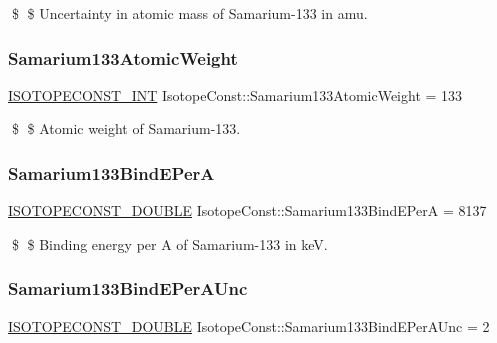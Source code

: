 \$ \$ Uncertainty in atomic mass of Samarium-\/133 in amu. \mbox{\label{group___isotope_const-_samarium-_sm133_ga2d8da4b99b3a0e80dea455f4bcf24f9e}} 
\subsubsection{\texorpdfstring{Samarium133\+Atomic\+Weight}{Samarium133AtomicWeight}}
{\footnotesize\ttfamily \mbox{\hyperlink{group___isotope_const-_macros_ga5f18360b3e99483a35c32d789e62621c}{I\+S\+O\+T\+O\+P\+E\+C\+O\+N\+S\+T\+\_\+\+I\+NT}} Isotope\+Const\+::\+Samarium133\+Atomic\+Weight = 133}

\$ \$ Atomic weight of Samarium-\/133. \mbox{\label{group___isotope_const-_samarium-_sm133_gab0f5adacf757a89ad52de6610861c2ab}} 
\subsubsection{\texorpdfstring{Samarium133\+Bind\+E\+PerA}{Samarium133BindEPerA}}
{\footnotesize\ttfamily \mbox{\hyperlink{group___isotope_const-_macros_ga8f45a7272ce02c0b4c65c44636ed719a}{I\+S\+O\+T\+O\+P\+E\+C\+O\+N\+S\+T\+\_\+\+D\+O\+U\+B\+LE}} Isotope\+Const\+::\+Samarium133\+Bind\+E\+PerA = 8137}

\$ \$ Binding energy per A of Samarium-\/133 in keV. \mbox{\label{group___isotope_const-_samarium-_sm133_ga48eabfa0f8e3695cfbbc5818c5e6861e}} 
\subsubsection{\texorpdfstring{Samarium133\+Bind\+E\+Per\+A\+Unc}{Samarium133BindEPerAUnc}}
{\footnotesize\ttfamily \mbox{\hyperlink{group___isotope_const-_macros_ga8f45a7272ce02c0b4c65c44636ed719a}{I\+S\+O\+T\+O\+P\+E\+C\+O\+N\+S\+T\+\_\+\+D\+O\+U\+B\+LE}} Isotope\+Const\+::\+Samarium133\+Bind\+E\+Per\+A\+Unc = 2}

